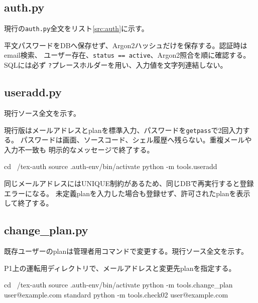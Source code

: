 \documentclass[uplatex,dvipdfmx,a4paper,11pt]{jsarticle}
\begin{document}
\subsection{auth.py}

現行の\texttt{auth.py}全文をリスト\ref{src:auth}に示す。



平文パスワードをDBへ保存せず、Argon2ハッシュだけを保存する。認証時はemail検索、
ユーザー存在、\texttt{status == active}、Argon2照合を順に確認する。SQLには必ず
\texttt{?}プレースホルダーを用い、入力値を文字列連結しない。

\subsection{useradd.py}

現行ソース全文を示す。



現行版はメールアドレスとplanを標準入力、パスワードを\texttt{getpass}で2回入力する。
パスワードは画面、ソースコード、シェル履歴へ残らない。重複メールや入力不一致も
明示的なメッセージで終了する。

\begin{command}
cd ~/tex-auth
source .auth-env/bin/activate
python -m tools.useradd
\end{command}

同じメールアドレスにはUNIQUE制約があるため、同じDBで再実行すると登録エラーになる。
未定義planを入力した場合も登録せず、許可されたplanを表示して終了する。

\subsection{change\_plan.py}

既存ユーザーのplanは管理者用コマンドで変更する。現行ソース全文を示す。



P1上の運転用ディレクトリで、メールアドレスと変更先planを指定する。

\begin{command}
cd ~/tex-auth
source .auth-env/bin/activate
python -m tools.change_plan user@example.com standard
python -m tools.check02 user@example.com
\end{command}
\end{document}

